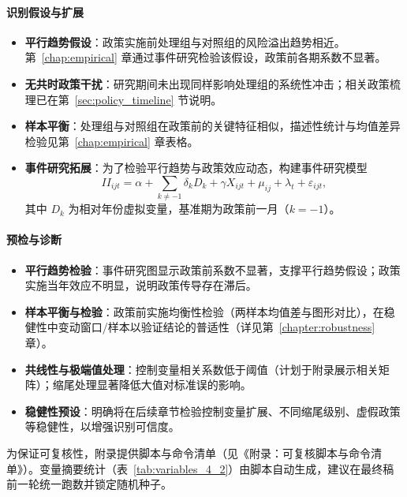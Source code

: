 \paragraph{识别假设与扩展}
\begin{itemize}
    \item \textbf{平行趋势假设}：政策实施前处理组与对照组的风险溢出趋势相近。第~\ref{chap:empirical} 章通过事件研究检验该假设，政策前各期系数不显著。
    \item \textbf{无共时政策干扰}：研究期间未出现同样影响处理组的系统性冲击；相关政策梳理已在第~\ref{sec:policy_timeline} 节说明。
    \item \textbf{样本平衡}：处理组与对照组在政策前的关键特征相似，描述性统计与均值差异检验见第~\ref{chap:empirical} 章表格。
    \item \textbf{事件研究拓展}：为了检验平行趋势与政策效应动态，构建事件研究模型
    \begin{equation}
        II_{ijt} = \alpha + \sum_{k \neq -1} \delta_k D_k + \gamma X_{ijt} + \mu_{ij} + \lambda_t + \varepsilon_{ijt},
        \label{eq:event_study}
    \end{equation}
    其中 \(D_k\) 为相对年份虚拟变量，基准期为政策前一月（\(k=-1\)）。
\end{itemize}

\paragraph{预检与诊断}
\label{sec:diagnostics}

\begin{itemize}
    \item \textbf{平行趋势检验}：事件研究图显示政策前系数不显著，支撑平行趋势假设；政策实施当年效应不明显，说明政策传导存在滞后。
    \item \textbf{样本平衡与检验}：政策前实施均衡性检验（两样本均值差与图形对比），在稳健性中变动窗口/样本以验证结论的普适性（详见第~\ref{chapter:robustness} 章）。
    \item \textbf{共线性与极端值处理}：控制变量相关系数低于阈值（计划于附录展示相关矩阵）；缩尾处理显著降低大值对标准误的影响。
    \item \textbf{稳健性预设}：明确将在后续章节检验控制变量扩展、不同缩尾级别、虚假政策等稳健性，以增强识别可信度。
\end{itemize}

为保证可复核性，附录提供脚本与命令清单（见《附录：可复核脚本与命令清单》）。变量摘要统计（表~\ref{tab:variables_4_2}）由脚本自动生成，建议在最终稿前一轮统一跑数并锁定随机种子。
